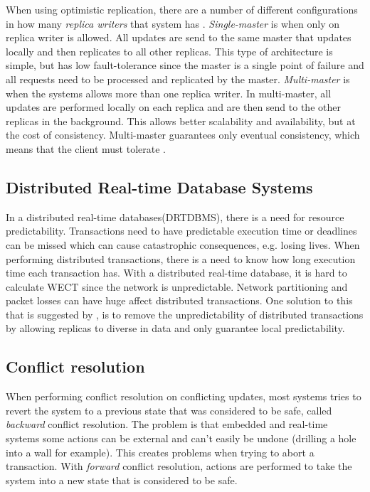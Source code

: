 When using optimistic replication, there are a number of different configurations in how many \emph{replica writers} that system has \cite[]{saito2005}. \emph{Single-master} is when only on replica writer is allowed. All updates are send to the same master that updates locally and then replicates to all other replicas.  This type of architecture is simple, but has low fault-tolerance since the master is a single point of failure and all requests need to be processed and replicated by the master. \emph{Multi-master} is when the systems allows more than one replica writer. In multi-master, all updates are performed locally on each replica and are then send to the other replicas in the background. This allows better scalability and availability, but at the cost of consistency. Multi-master guarantees only eventual consistency, which means that the client must tolerate .   	   


\subsection{Distributed Real-time Database Systems} %
\label{sub:subsection_name}

In a distributed real-time databases(DRTDBMS), there is a need for resource predictability. Transactions need to have predictable execution time or deadlines can be missed which can cause catastrophic consequences, e.g. losing lives. When performing distributed transactions, there is a need to know how long execution time each transaction has. With a distributed real-time database, it is hard to calculate WECT since the network is unpredictable. Network partitioning and packet losses can have huge affect distributed transactions. One solution to this that is suggested by \cite{deeds}, is to remove the unpredictability of distributed transactions by allowing replicas to diverse in data and only guarantee local predictability.  

\subsection{Conflict resolution} %
\label{sub:conflict_resolution}

When performing conflict resolution on conflicting updates, most systems tries to revert the system to a previous state that was considered to be safe, called \emph{backward} conflict resolution. The problem is that embedded and real-time systems some actions can be external and can't easily be undone (drilling a hole into a wall for example). This creates problems when trying to abort a transaction. 
With \emph{forward} conflict resolution, actions are performed to take the system into a new state that is considered to be safe.      

